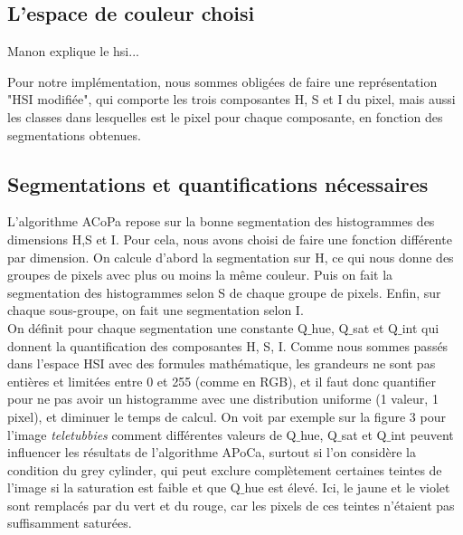 \documentclass{article}
\begin{document}
\subsection{L'espace de couleur choisi}

Manon explique le hsi...

Pour notre implémentation, nous sommes obligées de faire une représentation "HSI modifiée", qui comporte les trois composantes H, S et I du pixel, mais aussi les classes dans lesquelles est le pixel pour chaque composante, en fonction des segmentations obtenues.

\subsection{Segmentations et quantifications nécessaires}

L'algorithme ACoPa repose sur la bonne segmentation des histogrammes des dimensions H,S et I. Pour cela, nous avons choisi de faire une fonction différente par dimension. On calcule d'abord la segmentation sur H, ce qui nous donne des groupes de pixels avec plus ou moins la même couleur. Puis on fait la segmentation des histogrammes selon S de chaque groupe de pixels. Enfin, sur chaque sous-groupe, on fait une segmentation selon I.\\

On définit pour chaque segmentation une constante  Q$\_$hue,  Q$\_$sat et Q$\_$int qui donnent la quantification des composantes H, S, I. Comme nous sommes passés dans l'espace HSI avec des formules mathématique, les grandeurs ne sont pas entières et limitées entre 0 et 255 (comme en RGB), et il faut donc quantifier pour ne pas avoir un histogramme avec une distribution uniforme (1 valeur, 1 pixel), et diminuer le temps de calcul. On voit par exemple sur la figure 3 pour l'image {\it teletubbies} comment différentes valeurs de Q$\_$hue,  Q$\_$sat et Q$\_$int peuvent influencer les résultats de l'algorithme APoCa, surtout si l'on considère la condition du grey cylinder, qui peut exclure complètement certaines teintes de l'image si la saturation est faible et que Q$\_$hue est élevé. Ici, le jaune et le violet sont remplacés par du vert et du rouge, car les pixels de ces teintes n'étaient pas suffisamment saturées.\\
\end{document}

